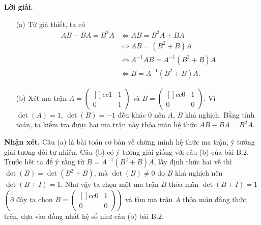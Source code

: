 \textbf{Lời giải. }

\begin{enumerate}
    \item[(a)] {Từ giả thiết, ta có
    \begin{align*}
        AB - BA = B^2A 
        & \iff AB = B^2A + BA\\
        & \iff AB = (B^2 + B)A \\
        & \iff A^{-1}AB = A^{-1}(B^2 + B)A \\
        & \iff B = A^{-1}(B^2 + B)A. 
    \end{align*}
    } 
    \item[(b)] {Xét ma trận $A = \begin{pmatrix}[]{cc}
        1 & 1 \\
        0 & 1
    \end{pmatrix}$ và $B = \begin{pmatrix}[]{cc}
        0 & 1 \\
        0 & 0
    \end{pmatrix}$. Vì $\det(A) = 1,\,\det(B) = -1$ đều khác 0 nên $A,\,B$ khả nghịch. Bằng tính toán, ta kiểm tra được hai ma trận này thỏa mãn hệ thức $AB - BA = B^2A$.}  
\end{enumerate}

\textbf{Nhận xét. }Câu (a) là bài toán cơ bản về chứng minh hệ thức ma trận, ý tưởng giải tương đối tự nhiên. Câu (b) có ý tưởng giải giống với câu (b) của bài B.2. Trước hết ta để ý rằng từ $B = A^{-1}(B^2 + B)A$, lấy định thức hai vế thì $\det(B) = \det(B^2+B)$, mà $\det(B) \ne 0$ do $B$ khả nghịch nên $\det(B+I)=1$. Như vậy ta chọn một ma trận $B$ thỏa mãn $\det(B+I)=1$ $\left(\text{ở đây ta chọn }B = \begin{pmatrix}[]{cc}
    0 & 1 \\
    0 & 0
\end{pmatrix}\right)$ và tìm ma trận $A$ thỏa mãn đẳng thức trên, dựa vào đồng nhất hệ số như câu (b) bài B.2.